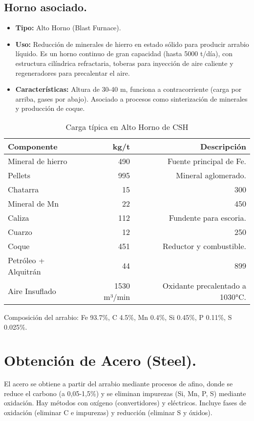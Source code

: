 \documentclass[12pt,a4paper]{article}
\begin{document}
\subsection{Horno asociado.}

\begin{itemize}
    \item \textbf{Tipo:} Alto Horno (Blast Furnace).
    \item \textbf{Uso:} Reducción de minerales de hierro en estado sólido para producir arrabio líquido. Es un horno continuo de gran capacidad (hasta 5000 t/día), con estructura cilíndrica refractaria, toberas para inyección de aire caliente y regeneradores para precalentar el aire.
    \item \textbf{Características:} Altura de 30-40 m, funciona a contracorriente (carga por arriba, gases por abajo). Asociado a procesos como sinterización de minerales y producción de coque.
\end{itemize}
\begin{table}[h]
    \centering
    \caption{Carga típica en Alto Horno de CSH}
    \begin{tabular}{|l|r|r|}
        \hline
        Componente & kg/t & Descripción \\ \hline
        Mineral de hierro & 490 & Fuente principal de Fe. \\
        Pellets & 995 & Mineral aglomerado. \\
        Chatarra & 15 & 300 \\
        Mineral de Mn & 22 & 450 \\
        Caliza & 112 & Fundente para escoria. \\
        Cuarzo & 12 & 250 \\
        Coque & 451 & Reductor y combustible. \\
        Petróleo + Alquitrán & 44 & 899 \\
        Aire Insuflado & 1530 m³/min & Oxidante precalentado a 1030°C. \\
        \hline
    \end{tabular}
\end{table}
Composición del arrabio: Fe 93.7\%, C 4.5\%, Mn 0.4\%, Si 0.45\%, P 0.11\%, S 0.025\%.

\section{Obtención de Acero (Steel).}

El acero se obtiene a partir del arrabio mediante procesos de afino, donde se reduce el carbono (a 0,05-1,5\%) y se eliminan impurezas (Si, Mn, P, S) mediante oxidación. Hay métodos con oxígeno (convertidores) y eléctricos. Incluye fases de oxidación (eliminar C e impurezas) y reducción (eliminar S y óxidos).
\end{document}
